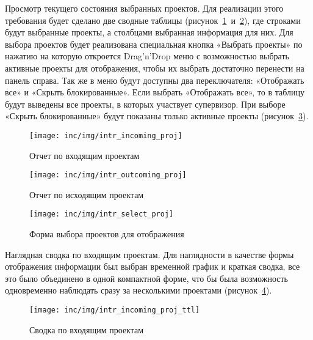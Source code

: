 Просмотр текущего состояния выбранных проектов.
Для реализации этого требования будет сделано две сводные таблицы (рисунок~\ref{pic:intr:proj:incoming}~и~\ref{pic:intr:proj:outcoming}),
где строками будут выбранные проекты, а столбцами выбранная информация для них.
Для выбора проектов будет реализована специальная кнопка «Выбрать проекты»
по нажатию на которую откроется Drag’n’Drop %
меню с возможностью
выбрать активные проекты для отображения,
чтобы их выбрать достаточно перенести на панель справа.
Так же в меню будут доступны два переключателя:
«Отображать все» и «Скрыть блокированные».
Если выбрать «Отображать все», то в таблицу будут выведены все проекты,
в которых участвует супервизор.
При выборе «Скрыть блокированные» будут показаны только активные проекты (рисунок~\ref{pic:intr:proj:select}).

\begin{figure}[ht]
    \centering
    \texttt{[image: inc/img/intr\_incoming\_proj]}
    \caption{Отчет по входящим проектам}
    \label{pic:intr:proj:incoming}
\end{figure}

\begin{figure}[ht]
    \centering
    \texttt{[image: inc/img/intr\_outcoming\_proj]}
    \caption{Отчет по исходящим проектам}
    \label{pic:intr:proj:outcoming}
\end{figure}

\begin{figure}[ht]
    \centering
    \texttt{[image: inc/img/intr\_select\_proj]}
    \caption{Форма выбора проектов для отображения}
    \label{pic:intr:proj:select}
\end{figure}

Наглядная сводка по входящим проектам.
Для наглядности в качестве формы отображения информации был выбран временной
график и краткая сводка,
все это было объединено в одной компактной форме,
что бы была возможность одновременно наблюдать сразу за несколькими проектами
(рисунок~\ref{pic:intr:proj:incoming:total}).

\begin{figure}[ht]
    \centering
    \texttt{[image: inc/img/intr\_incoming\_proj\_ttl]}
    \caption{Сводка по входящим проектам}
    \label{pic:intr:proj:incoming:total}
\end{figure}

